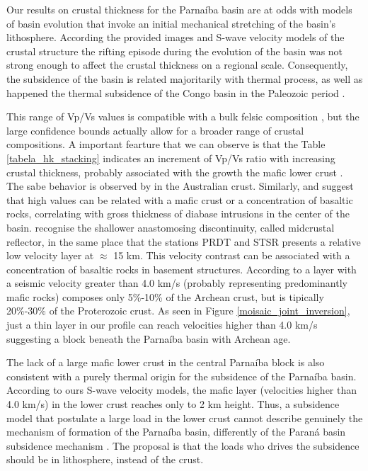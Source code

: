 \documentclass[paper,11pt]{geophysics}
\begin{document}
Our results on crustal thickness for the Parnaíba basin are at odds with models of basin evolution that invoke an initial mechanical stretching of the basin's lithosphere. According the provided images and S-wave velocity models of the crustal structure the rifting episode during the evolution of the basin was not strong enough to affect the crustal thickness on a regional scale. Consequently, the subsidence of the basin is related majoritarily with thermal process, as well as happened the thermal subsidence of the Congo basin in the Paleozoic period \citep{daly_tectonic_1992} .

This range of Vp/Vs values is compatible with a bulk felsic composition \citep{christensen_poissons_1996}, but the large confidence bounds actually allow for a broader range of crustal compositions. A important fearture that we can observe is that the Table \ref{tabela_hk_stacking} indicates an increment of Vp/Vs ratio with increasing crustal thickness, probably associated with the growth the mafic lower crust \citep{christensen_poissons_1996}. The sabe behavior is observed by \cite{chevrot_australia_2000} in the Australian crust. Similarly, \cite{christensen_poissons_1996} and \cite{julia_deep_2008} suggest that high values can be related with a mafic crust or a concentration of basaltic rocks, correlating with gross thickness of diabase intrusions in the center of the basin. \cite{daly_brasiliano_2014} recognise the shallower anastomosing discontinuity, called midcrustal reflector, in the same place that the stations PRDT and STSR presents a relative low velocity layer at $\approx$ 15 km. This velocity contrast can be associated with a concentration of basaltic rocks in basement structures. According to \cite{durrheim_archean_1991,durrheim_evolution_1994} a layer with a seismic velocity greater than 4.0 km/s (probably representing predominantly mafic rocks) composes only 5\%-10\% of the Archean crust, but is tipically 20\%-30\% of the Proterozoic crust. As seen in Figure \ref{moisaic_joint_inversion}, just a thin layer in our profile can reach velocities higher than 4.0 km/s suggesting a block beneath the Parnaíba basin with Archean age.

The lack of a large mafic lower crust in the central Parnaíba block is also consistent with a purely thermal origin for the subsidence of the Parnaíba basin. According to ours S-wave velocity models, the mafic layer (velocities higher than 4.0 km/s) in the lower crust reaches only to 2 km height. Thus, a subsidence model that postulate a large load in the lower crust cannot describe genuinely the mechanism of formation of the Parnaíba basin, differently of the Paraná basin subsidence mechanism \citep{julia_deep_2008}. The proposal is that the loads who drives the subsidence should be in lithosphere, instead of the crust.
\end{document}
